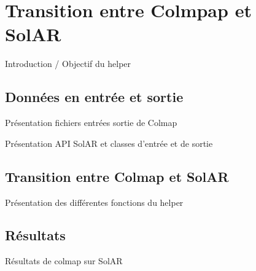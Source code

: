 \chapter{Transition entre Colmpap et SolAR}

Introduction / Objectif du helper

\section{Données en entrée et sortie}

Présentation fichiers entrées sortie de Colmap

Présentation API SolAR et classes d'entrée et de sortie

\section{Transition entre Colmap et SolAR}

Présentation des différentes fonctions du helper

\section{Résultats}

Résultats de colmap sur SolAR